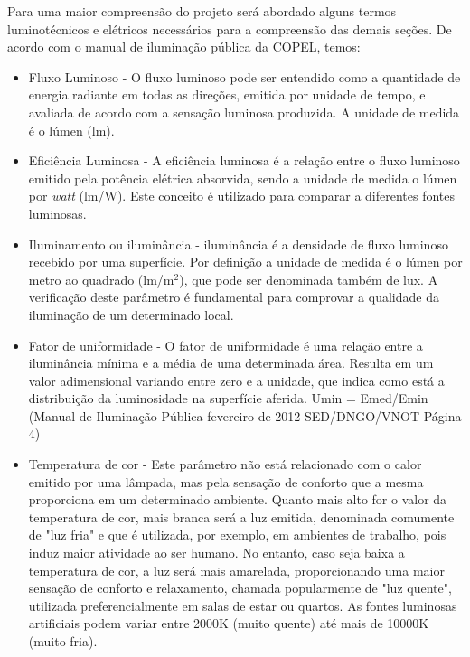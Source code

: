 Para uma maior compreens\~ao do projeto ser\'a abordado alguns termos luminot\'ecnicos e el\'etricos necess\'arios para a compreens\~ao das demais se\c{c}\~oes. De acordo com o manual de ilumina\c{c}\~ao p\'ublica da COPEL, temos:

 \begin{itemize}
        \item Fluxo Luminoso - O fluxo luminoso pode ser entendido como a quantidade de energia radiante em todas as dire\c{c}\~oes, emitida por unidade de tempo, e avaliada de acordo com a sensa\c{c}\~ao luminosa produzida. A unidade de medida \'e o l\'umen (lm).
	\item Efici\^encia Luminosa - A efici\^encia luminosa \'e a rela\c{c}\~ao entre o fluxo luminoso emitido pela pot\^encia el\'etrica absorvida, sendo a unidade de medida o l\'umen por \textit{watt} (lm/W). Este conceito \'e utilizado para comparar a diferentes fontes luminosas.
	\item Iluminamento ou ilumin\^ancia - ilumin\^ancia \'e a densidade de fluxo luminoso recebido por uma superf\'icie. Por defini\c{c}\~ao a unidade de medida \'e o l\'umen por metro ao quadrado (lm/m$^{2}$), que pode ser denominada tamb\'em de lux. A verifica\c{c}\~ao deste par\^ametro \'e fundamental para comprovar a qualidade da ilumina\c{c}\~ao de um determinado local.
	\item Fator de uniformidade - O fator de uniformidade \'e uma rela\c{c}\~ao entre a ilumin\^ancia m\'inima e a m\'edia de uma determinada \'area. Resulta em um valor adimensional variando entre zero e a unidade, que indica como est\'a a distribui\c{c}\~ao da luminosidade na superf\'icie aferida. Umin = Emed/Emin (Manual de Ilumina\c{c}\~ao P\'ublica fevereiro de 2012 SED/DNGO/VNOT P\'agina 4)
	\item Temperatura de cor - Este par\^ametro n\~ao est\'a relacionado com o calor emitido por uma l\^ampada, mas pela sensa\c{c}\~ao de conforto que a mesma proporciona em um determinado ambiente. Quanto mais alto for o valor da temperatura de cor, mais branca ser\'a a luz emitida, denominada comumente de "luz fria" e que \'e utilizada, por exemplo, em ambientes de trabalho, pois induz maior atividade ao ser humano. No entanto, caso seja baixa a temperatura de cor, a luz ser\'a mais amarelada, proporcionando uma maior sensa\c{c}\~ao de conforto e relaxamento, chamada popularmente de "luz quente", utilizada preferencialmente em salas de estar ou quartos. As fontes luminosas artificiais podem variar entre 2000K (muito quente) at\'e mais de 10000K (muito fria).

\end{itemize}
